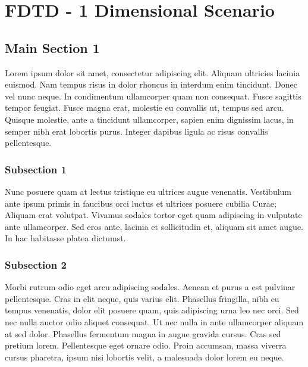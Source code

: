 
\chapter{FDTD - 1 Dimensional Scenario} %

\label{Chapter2} %


\section{Main Section 1}

Lorem ipsum dolor sit amet, consectetur adipiscing elit. Aliquam ultricies lacinia euismod. Nam tempus risus in dolor rhoncus in interdum enim tincidunt. Donec vel nunc neque. In condimentum ullamcorper quam non consequat. Fusce sagittis tempor feugiat. Fusce magna erat, molestie eu convallis ut, tempus sed arcu. Quisque molestie, ante a tincidunt ullamcorper, sapien enim dignissim lacus, in semper nibh erat lobortis purus. Integer dapibus ligula ac risus convallis pellentesque.

\subsection{Subsection 1}

Nunc posuere quam at lectus tristique eu ultrices augue venenatis. Vestibulum ante ipsum primis in faucibus orci luctus et ultrices posuere cubilia Curae; Aliquam erat volutpat. Vivamus sodales tortor eget quam adipiscing in vulputate ante ullamcorper. Sed eros ante, lacinia et sollicitudin et, aliquam sit amet augue. In hac habitasse platea dictumst.


\subsection{Subsection 2}
Morbi rutrum odio eget arcu adipiscing sodales. Aenean et purus a est pulvinar pellentesque. Cras in elit neque, quis varius elit. Phasellus fringilla, nibh eu tempus venenatis, dolor elit posuere quam, quis adipiscing urna leo nec orci. Sed nec nulla auctor odio aliquet consequat. Ut nec nulla in ante ullamcorper aliquam at sed dolor. Phasellus fermentum magna in augue gravida cursus. Cras sed pretium lorem. Pellentesque eget ornare odio. Proin accumsan, massa viverra cursus pharetra, ipsum nisi lobortis velit, a malesuada dolor lorem eu neque.

